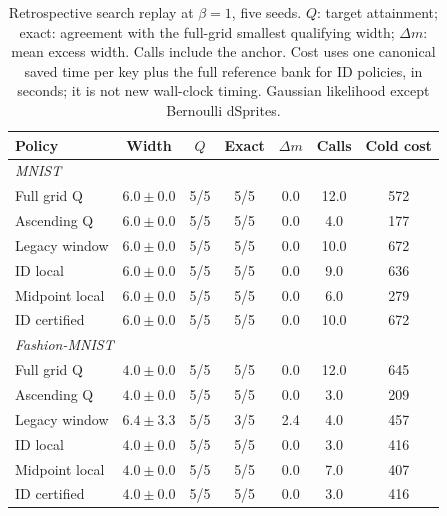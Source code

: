 \documentclass[make,article,submit,pdftex,moreauthors]{Definitions/mdpi}
\begin{document}
\begin{table}[H]
\caption{Retrospective search replay at $\beta=1$, five seeds. $Q$: target attainment; exact: agreement with the full-grid smallest qualifying width; $\Delta m$: mean excess width. Calls include the anchor. Cost uses one canonical saved time per key plus the full reference bank for ID policies, in seconds; it is not new wall-clock timing. Gaussian likelihood except Bernoulli dSprites.}\label{tab:replay1}
\small
\setlength{\tabcolsep}{3pt}
\begin{tabular*}{\textwidth}{@{\extracolsep{\fill}}lcccccc@{}}
\toprule
Policy & Width & $Q$ & Exact & $\Delta m$ & Calls & Cold cost \\
\midrule
\multicolumn{7}{l}{\emph{MNIST}} \\
Full grid Q & $6.0 \pm 0.0$ & 5/5 & 5/5 & 0.0 & 12.0 & 572 \\
Ascending Q & $6.0 \pm 0.0$ & 5/5 & 5/5 & 0.0 & 4.0 & 177 \\
Legacy window & $6.0 \pm 0.0$ & 5/5 & 5/5 & 0.0 & 10.0 & 672 \\
ID local & $6.0 \pm 0.0$ & 5/5 & 5/5 & 0.0 & 9.0 & 636 \\
Midpoint local & $6.0 \pm 0.0$ & 5/5 & 5/5 & 0.0 & 6.0 & 279 \\
ID certified & $6.0 \pm 0.0$ & 5/5 & 5/5 & 0.0 & 10.0 & 672 \\
\midrule
\multicolumn{7}{l}{\emph{Fashion-MNIST}} \\
Full grid Q & $4.0 \pm 0.0$ & 5/5 & 5/5 & 0.0 & 12.0 & 645 \\
Ascending Q & $4.0 \pm 0.0$ & 5/5 & 5/5 & 0.0 & 3.0 & 209 \\
Legacy window & $6.4 \pm 3.3$ & 5/5 & 3/5 & 2.4 & 4.0 & 457 \\
ID local & $4.0 \pm 0.0$ & 5/5 & 5/5 & 0.0 & 3.0 & 416 \\
Midpoint local & $4.0 \pm 0.0$ & 5/5 & 5/5 & 0.0 & 7.0 & 407 \\
ID certified & $4.0 \pm 0.0$ & 5/5 & 5/5 & 0.0 & 3.0 & 416 \\
\bottomrule\end{tabular*}
\end{table}
\end{document}
